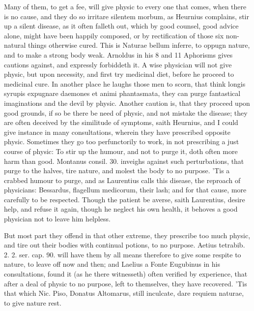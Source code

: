 {Many of them, to get a fee, will give physic to every one that
comes, when there is no cause, and they do so irritare silentem morbum,
as Heurnius complains, stir up a silent disease, as it often
falleth out, which by good counsel, good advice alone, might have been
happily composed, or by rectification of those six non-natural things
otherwise cured. This is Naturae bellum inferre, to oppugn nature, and
to make a strong body weak. Arnoldus in his 8 and 11 Aphorisms gives
cautions against, and expressly forbiddeth it. A wise physician
will not give physic, but upon necessity, and first try medicinal diet,
before he proceed to medicinal cure. In another place he laughs
those men to scorn, that think longis syrupis expugnare daemones et
animi phantasmata, they can purge fantastical imaginations and the
devil by physic. Another caution is, that they proceed upon good
grounds, if so be there be need of physic, and not mistake the disease;
they are often deceived by the similitude of symptoms, saith
Heurnius, and I could give instance in many consultations, wherein they
have prescribed opposite physic. Sometimes they go too perfunctorily to
work, in not prescribing a just course of physic: To stir up the
humour, and not to purge it, doth often more harm than good. Montanus
consil. 30. inveighs against such perturbations, that purge to the
halves, tire nature, and molest the body to no purpose. 'Tis a crabbed
humour to purge, and as Laurentius calls this disease, the reproach of
physicians: Bessardus, flagellum medicorum, their lash; and for that
cause, more carefully to be respected. Though the patient be averse,
saith Laurentius, desire help, and refuse it again, though he neglect
his own health, it behoves a good physician not to leave him helpless.

But most part they offend in that other extreme, they prescribe too
much physic, and tire out their bodies with continual potions, to no
purpose. Aetius tetrabib. 2. 2. ser. cap. 90. will have them by all
means therefore to give some respite to nature, to leave off now
and then; and Laelius a Fonte Eugubinus in his consultations, found it
(as he there witnesseth) often verified by experience, that after
a deal of physic to no purpose, left to themselves, they have
recovered. 'Tis that which Nic. Piso, Donatus Altomarus, still
inculcate, dare requiem naturae, to give nature rest.

}
